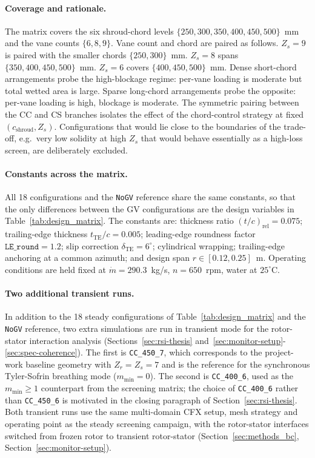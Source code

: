 \paragraph{Coverage and rationale.}
The matrix covers the six shroud-chord levels $\{250, 300, 350, 400, 450, 500\}$~mm and the vane counts $\{6, 8, 9\}$. Vane count and chord are paired as follows. $Z_s = 9$ is paired with the smaller chords $\{250, 300\}$~mm. $Z_s = 8$ spans $\{350, 400, 450, 500\}$~mm. $Z_s = 6$ covers $\{400, 450, 500\}$~mm. Dense short-chord arrangements probe the high-blockage regime: per-vane loading is moderate but total wetted area is large. Sparse long-chord arrangements probe the opposite: per-vane loading is high, blockage is moderate. The symmetric pairing between the CC and CS branches isolates the effect of the chord-control strategy at fixed $(c_{\mathrm{shroud}}, Z_s)$. Configurations that would lie close to the boundaries of the trade-off, e.g.\ very low solidity at high $Z_s$ that would behave essentially as a high-loss screen, are deliberately excluded.
 
\paragraph{Constants across the matrix.}
All 18 configurations and the \texttt{NoGV} reference share the same constants, so that the only differences between the GV configurations are the design variables in Table~\ref{tab:design_matrix}. The constants are: thickness ratio $(t/c)_{\mathrm{rel}} = 0.075$; trailing-edge thickness $t_{\mathrm{TE}}/c = 0.005$; leading-edge roundness factor $\texttt{LE\_round} = 1.2$; slip correction $\delta_{\mathrm{TE}} = 6^\circ$; cylindrical wrapping; trailing-edge anchoring at a common azimuth; and design span $r \in [0.12, 0.25]$~m. Operating conditions are held fixed at $\dot m = 290.3$~kg/s, $n = 650$~rpm, water at $25^\circ$C.

\paragraph{Two additional transient runs.}
In addition to the 18 steady configurations of Table~\ref{tab:design_matrix} and the \texttt{NoGV} reference, two extra simulations are run in transient mode for the rotor-stator interaction analysis (Sections~\ref{sec:rsi-thesis} and~\ref{sec:monitor-setup}-\ref{sec:spec-coherence}). The first is \texttt{CC\_450\_7}, which corresponds to the project-work baseline geometry with $Z_r=Z_s=7$ and is the reference for the synchronous Tyler-Sofrin breathing mode ($m_{\min}=0$). The second is \texttt{CC\_400\_6}, used as the $m_{\min}\geq 1$ counterpart from the screening matrix; the choice of \texttt{CC\_400\_6} rather than \texttt{CC\_450\_6} is motivated in the closing paragraph of Section~\ref{sec:rsi-thesis}. Both transient runs use the same multi-domain CFX setup, mesh strategy and operating point as the steady screening campaign, with the rotor-stator interfaces switched from frozen rotor to transient rotor-stator (Section~\ref{sec:methods_bc}, Section~\ref{sec:monitor-setup}).

